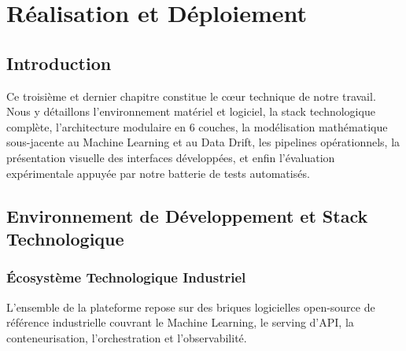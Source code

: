 \documentclass[11pt,a4paper,oneside]{report}
\begin{document}
\newpage

\chapter{Réalisation et Déploiement}

\section{Introduction}
Ce troisième et dernier chapitre constitue le cœur technique de notre travail. Nous y détaillons l'environnement matériel et logiciel, la stack technologique complète, l'architecture modulaire en 6 couches, la modélisation mathématique sous-jacente au Machine Learning et au Data Drift, les pipelines opérationnels, la présentation visuelle des interfaces développées, et enfin l'évaluation expérimentale appuyée par notre batterie de tests automatisés.

\section{Environnement de Développement et Stack Technologique}

\subsection{Écosystème Technologique Industriel}
L'ensemble de la plateforme repose sur des briques logicielles open-source de référence industrielle couvrant le Machine Learning, le serving d'API, la conteneurisation, l'orchestration et l'observabilité.
\end{document}
